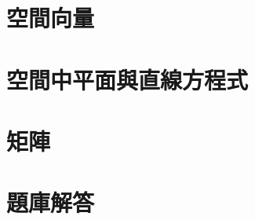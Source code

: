 \documentclass[a4paper,12pt]{report}
\begin{document}
\chapter{空間向量}


\chapter{空間中平面與直線方程式}


\chapter{矩陣}


\chapter{題庫解答}

\end{document}
